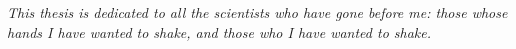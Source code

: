 \chapter*{~}


\begin{center}                  %
\vspace*{3in}                   %
    \begin{onehalfspacing}      %
    \textit{
    This thesis is dedicated to all the scientists who have gone before me: those whose hands I have wanted to shake, and those who I have wanted to shake.     %
    }
\end{onehalfspacing}
\end{center}